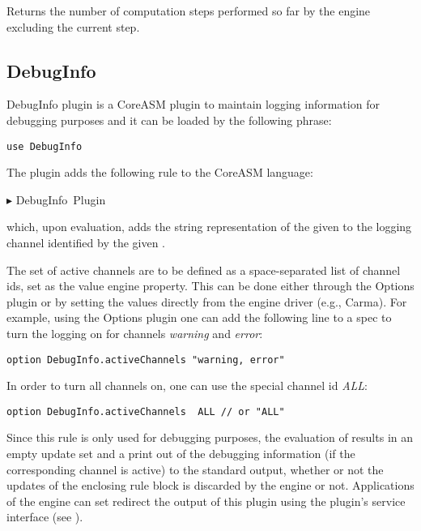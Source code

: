 \documentclass{article}
\makeatletter
\newcommand{\CoreASM}{{\sffamily CoreASM}\xspace}
\newcommand{\Carma}{{\sffamily Carma}\xspace}
\newcommand{\ruleform}[2]{\pform{$\blacktriangleright$}{#1}{#2}}
\newcommand{\pform}[3]{\vspace*{4mm} \noindent #1 #2 \vspace{1mm}\textcolor[gray]{0.7}{\dotfill}\mbox{{\sffamily \footnotesize #3}}}
\newcommand{\indexrule}[1]{\index{#1 rule@\asm{#1} rule}}
\makeatother
\begin{document}
Returns the number of computation steps performed so far by the engine excluding the current step.

\subsection{DebugInfo} 
\label{debugInfo}

DebugInfo plugin is a \CoreASM plugin to maintain logging information for debugging purposes and it 
can be loaded by the following  phrase:

\begin{lstlisting}
use DebugInfo
\end{lstlisting}

The plugin adds the following rule to the \CoreASM language:

\ruleform{
}{DebugInfo Plugin}
\indexrule{debuginfo}

\noindent which, upon evaluation, adds the string representation of the given  to the logging channel identified by the given . 

The set of active channels are to be defined as a space-separated list of channel ids, set as the value  engine property. This can be done either through the Options plugin or by setting the values directly from the engine driver (e.g., \Carma). For example, using the Options plugin one can add the following line to a spec to turn the logging on for channels {\em warning} and {\em error}:

\begin{lstlisting}
option DebugInfo.activeChannels "warning, error"
\end{lstlisting}

\noindent In order to turn all channels on, one can use the special channel id {\em ALL}:


\begin{lstlisting}
option DebugInfo.activeChannels  ALL // or "ALL"
\end{lstlisting}

Since this rule is only used for debugging purposes, the evaluation of  results in an empty update set and a print out of the debugging information (if the corresponding channel is active) to the standard output, whether or not the updates of the enclosing rule block is discarded by the engine or not. Applications of the engine can set redirect the output of this plugin using the plugin's service interface (see ). 
\end{document}
